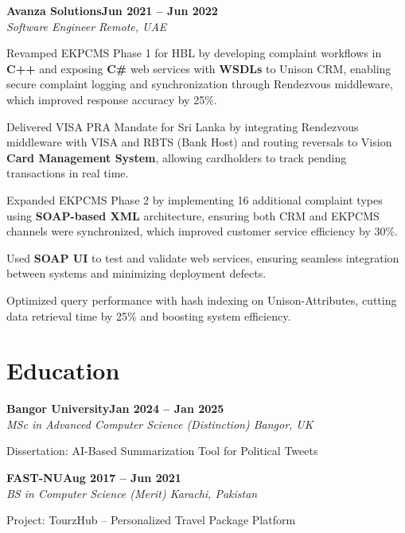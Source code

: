 \documentclass[letterpaper,10pt]{article}
\newcommand{\headingBf}[2]{
  \hspace{10pt}\textbf{#1}\hfill\textbf{#2}\\
}
\newcommand{\headingIt}[2]{
  \hspace{10pt}\textit{#1}\hfill\textit{#2}\\
}
\newenvironment{resume_list}{
  \vspace{-7pt}
  \begin{itemize}[itemsep=-2px, parsep=1pt, leftmargin=30pt]
}{
  \end{itemize}
}
\begin{document}
\headingBf{Avanza Solutions}{Jun 2021 -- Jun 2022}
\headingIt{Software Engineer \hfill Remote, UAE}{}
\begin{resume_list}
    \item Revamped EKPCMS Phase 1 for HBL by developing complaint workflows in \textbf{C++} and exposing \textbf{C\#} web services with \textbf{WSDLs} to Unison CRM, enabling secure complaint logging and synchronization through Rendezvous middleware, which improved response accuracy by 25\%.
    \item Delivered VISA PRA Mandate for Sri Lanka by integrating Rendezvous middleware with VISA and RBTS (Bank Host) and routing reversals to Vision \textbf{Card Management System}, allowing cardholders to track pending transactions in real time.
    \item Expanded EKPCMS Phase 2 by implementing 16 additional complaint types using \textbf{SOAP-based XML} architecture, ensuring both CRM and EKPCMS channels were synchronized, which improved customer service efficiency by 30\%.
    \item Used \textbf{SOAP UI} to test and validate web services, ensuring seamless integration between systems and minimizing deployment defects.
    \item Optimized query performance with hash indexing on Unison-Attributes, cutting data retrieval time by 25\% and boosting system efficiency.
\end{resume_list}

\section{Education}

\headingBf{Bangor University}{Jan 2024 -- Jan 2025}
\headingIt{MSc in Advanced Computer Science (Distinction) \hfill Bangor, UK}{}
\begin{resume_list}
    \item Dissertation: AI-Based Summarization Tool for Political Tweets
\end{resume_list}

\headingBf{FAST-NU}{Aug 2017 -- Jun 2021}
\headingIt{BS in Computer Science (Merit) \hfill Karachi, Pakistan}{}
\begin{resume_list}
    \item Project: TourzHub -- Personalized Travel Package Platform
\end{resume_list}

\end{document}
